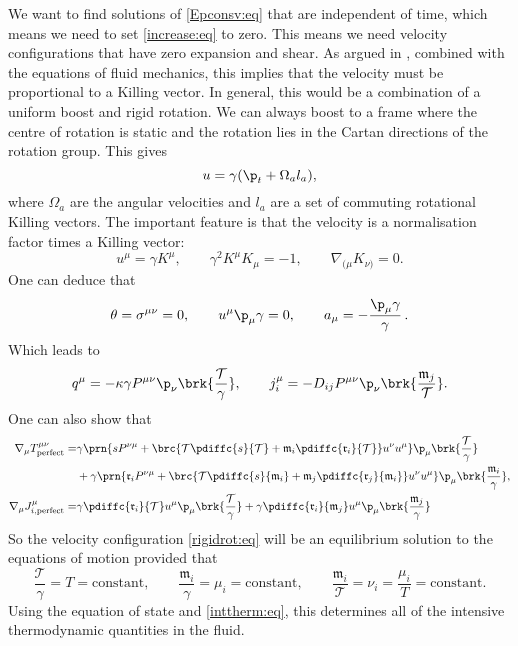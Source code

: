 \documentclass[12pt]{article}
\newcommand{\tloc}{\mathcal{T}}
\newcommand{\rl}{\mathfrak{r}}
\newcommand{\ml}{\mathfrak{m}}
\newcommand{\mg}{\mu}
\newcommand{\perf}{_\text{perfect}}
\begin{document}
We want to find solutions of \eqref{Epconsv:eq} that are independent of time, which means we need to set \eqref{increase:eq} to zero.
This means we need velocity configurations that have zero expansion and shear.
As argued in \cite{Caldarelli:2008mv}, combined with the equations of fluid mechanics, this implies that the velocity must be proportional to a Killing vector.
In general, this would be a combination of a uniform boost and rigid rotation.
We can always boost to a frame where the centre of rotation is static and the rotation lies in the Cartan directions of the rotation group. This gives
%
\begin{equation}\label{rigidrot:eq}
  u = \gamma(\p_t + \Omega_a l_a),
\end{equation}
%
where $\Omega_a$ are the angular velocities and $l_a$ are a set of commuting rotational Killing vectors. The important feature is that the velocity is a normalisation factor times a Killing vector:
%
\begin{equation}\label{eqvel:eq}
  u^\mu = \gamma K^\mu, \qquad
  \gamma^2 K^\mu K_\mu = -1, \qquad
  \nabla_{(\mu} K_{\nu)} = 0.
\end{equation}
%
One can deduce that
%
\begin{equation}\label{rotvelder:eq}
  \theta = \sigma^{\mu\nu}=0, \qquad
  u^\mu \p_\mu \gamma = 0, \qquad
  a_\mu = -\frac{\p_\mu \gamma}{\gamma}\,.
\end{equation}
%
Which leads to
%
\begin{equation*}
  q^\mu = -\kappa \gamma P^{\mu\nu} \p_\nu \brk{\frac{\tloc}{\gamma}}, \qquad
  j^\mu_i = -D_{ij} P^{\mu\nu} \p_\nu \brk{\frac{\ml_j}{\tloc}}.
\end{equation*}
%
One can also show that
%
\begin{equation*}
\begin{split}
  \nabla_\mu T^{\mu\nu}\perf =&
    \gamma \prn{s P^{\nu\mu}
        + \brc{\tloc \pdiffc{s}{\tloc} + \ml_i \pdiffc{\rl_i}{\tloc}} u^\nu u^\mu}
       \p_\mu \brk{\frac{\tloc}{\gamma}}\\
   &+\gamma \prn{\rl_i P^{\nu\mu}
        + \brc{\tloc \pdiffc{s}{\ml_i} + \ml_j \pdiffc{\rl_j}{\ml_i}} u^\nu u^\mu}
       \p_\mu \brk{\frac{\ml_i}{\gamma}},\\
  \nabla_\mu J^\mu_{i,\text{perfect}} =&
   \gamma \pdiffc{\rl_i}{\tloc} u^\mu\p_\mu \brk{\frac{\tloc}{\gamma}}
   + \gamma \pdiffc{\rl_i}{\ml_j} u^\mu\p_\mu \brk{\frac{\ml_j}{\gamma}}
\end{split}
\end{equation*}
%
So the velocity configuration \eqref{rigidrot:eq} will be an equilibrium solution to the equations of motion provided that
%
\begin{equation}\label{rotsol:eq}
  \frac{\tloc}{\gamma} = T = \text{constant}, \qquad
  \frac{\ml_i}{\gamma} = \mg_i = \text{constant}, \qquad
  \frac{\ml_i}{\tloc} = \nu_i = \frac{\mg_i}{T} = \text{constant}.
\end{equation}
%
Using the equation of state and \eqref{inttherm:eq}, this determines all of the intensive thermodynamic quantities in the fluid.
\end{document}

